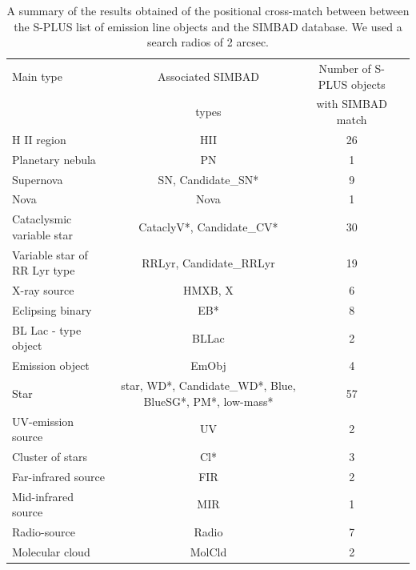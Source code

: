 \documentclass[fleqn,usenatbib]{mnras}
\begin{document}
\begin{table}
\centering
\caption{A summary of the results obtained of the positional cross-match between
         between the S-PLUS list of emission line objects and the SIMBAD database.
          We used a search radios of 2 arcsec. 
                                               }
\label{tab:simbad-sources}
\begin{tabular}{lccc} %
  \hline
Main type    & Associated SIMBAD           & Number of S-PLUS objects    \\
             & types                        &  with SIMBAD match         \\
\hline
H II region                & HII                     & 26                \\
Planetary nebula           & PN                      & 1                 \\
Supernova                  & SN, Candidate\_SN*      & 9                 \\
Nova                       & Nova                    & 1                 \\
Cataclysmic variable star  & CataclyV*, Candidate\_CV* & 30              \\
Variable star of RR Lyr type & RRLyr, Candidate\_RRLyr & 19              \\
X-ray source                & HMXB, X                  & 6               \\
Eclipsing binary            & EB*                    & 8                 \\            
BL Lac - type object        & BLLac                  & 2                 \\
Emission object             & EmObj                  & 4                 \\
Star                        & star, WD*, Candidate\_WD*, Blue, BlueSG*, PM*, low-mass* & 57 \\
UV-emission source          & UV                     & 2                 \\
Cluster of stars            & Cl*                    & 3                 \\
Far-infrared source         & FIR                    & 2                 \\
Mid-infrared source         & MIR                    & 1                 \\
Radio-source                & Radio                  & 7                 \\
Molecular cloud             & MolCld                 & 2                 \\

\end{tabular}
\end{table}
\end{document}
